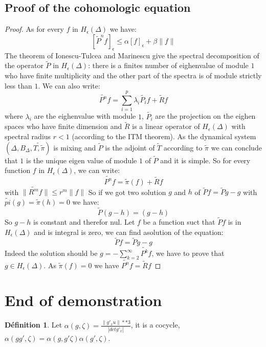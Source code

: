 \documentclass[12pt]{article}
\theoremstyle{plain}%
\theoremstyle{definition}
\newtheorem{dfnt}{Définition}[section]
\theoremstyle{remark}
\begin{document}
\subsection{Proof of the cohomologic equation}
\begin{proof}
As for every $f$ in $H_\epsilon(\Delta)$ we have: \[
[\tilde{P}^n f]_\epsilon \leq \alpha [f]_\epsilon +\beta \| f \|
\]
The theorem of Ionescu-Tulcea and Marinescu \cite{ITM} give the spectral decomposition of the operator $\tilde{P}$ in $H_\epsilon(\Delta)$: there is a finites number of eighenvalue of module $1$ who have finite multiplicity and the other part of the spectra is of module strictly less than $1$. We can also write: \[
\tilde{P^n}f=\sum_{i=1}^p \lambda_i \tilde{P_i}f + \tilde{R}f
\]
where $\lambda_i$ are the eighenvalue with module $1$, $\tilde{P_i}$ are the projection on the eighen spaces who have finite dimension and $\tilde{R}$ is a linear operator of $H_\epsilon(\Delta)$ with spectral radius $r<1$ (according to the ITM theorem).\newline
As the dynamical system $(\Delta,B_\Delta,\tilde{T,\tilde{\pi}})$ is mixing and $\tilde{P}$ is the adjoint of $\tilde{T}$ according to $\tilde{\pi}$ we can conclude that $1$ is the unique eigen value of module $1$ of $\tilde{P}$ and it is simple. So for every function $f$ in $H_\epsilon(\Delta)$, we can write:\[
\tilde{P^n}f=\tilde{\pi}(f)+\tilde{R}f
\]
with $\| \tilde{R^m}f\| \leq r^m \|f\|$\newline
So if we got two solution $g$ and $h$ of $\tilde{P}f=\tilde{P}g-g$ with $\tilde{pi}(g)=\tilde{\pi}(h)=0$ we have: \[
\tilde{P}(g-h)=(g-h)
\]
So $g-h$ is constant and therefor nul.\newline
Let $f$ be a function suct that $\tilde{P}f$ is in $H_\epsilon(\Delta)$ and is integral is zero, we can find asolution of the equation:\[
\tilde{P}f=\tilde{P}g-g
\]
Indeed the solution should be $g=-\sum_{k=2}^{\infty} \tilde{P^k}f$, we have to prove that $g\in H_\epsilon(\Delta)$.\newline
As $\tilde{\pi}(f)=0$ we have $\tilde{P^n}f=\tilde{R}f$
\end{proof}

\section{End of demonstration}

\begin{dfnt}
Let $\alpha (g,\zeta)=\frac{\| g'_x u\|**3}{|det g'_x|}$, it is a cocycle, $\alpha(g g', \zeta)=\alpha(g,g' \zeta) \alpha(g',\zeta)$.
\end{dfnt}
\end{document}
